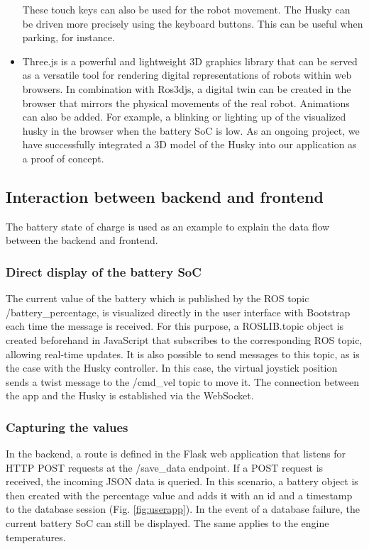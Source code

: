 \documentclass[conference]{IEEEtran}
\begin{document}
\begin{itemize}
These touch keys can also be used for the robot movement. The Husky can be driven more precisely using the keyboard buttons. This can be useful when parking, for instance.
\item Three.js is a powerful and lightweight 3D graphics library that can be served as a versatile tool for rendering digital representations of robots within web browsers. In combination with Ros3djs, a digital twin can be created in the browser that mirrors the physical movements of the real robot. Animations can also be added. For example, a blinking or lighting up of the visualized husky in the browser when the battery SoC is low. 
As an ongoing project, we have successfully integrated a 3D model of the Husky into our application as a proof of concept.
\end{itemize}

\subsection{Interaction between backend and frontend}
The battery state of charge is used as an example to explain the data flow between the backend and frontend. 
\subsubsection{Direct display of the battery SoC}
The current value of the battery which is published by the ROS topic /battery\_percentage, is visualized directly in the user interface with Bootstrap each time the message is received. For this purpose, a ROSLIB.topic object is created beforehand in JavaScript that subscribes to the corresponding ROS topic, allowing real-time updates. It is also possible to send messages to this topic, as is the case with the Husky controller. 
In this case, the virtual joystick position sends a twist message to the /cmd\_vel topic to move it. 
The connection between the app and the Husky is established via the WebSocket. 
\subsubsection{Capturing the values}
In the backend, a route is defined in the Flask web application that listens for HTTP POST requests at the /save\_data endpoint. If a POST request is received, the incoming JSON data is queried. In this scenario, a battery object is then created with the percentage value and adds it with an id and a timestamp to the database session (Fig. \ref{fig:userapp}). In the event of a database failure, the current battery SoC can still be displayed. The same applies to the engine temperatures.
\end{document}
